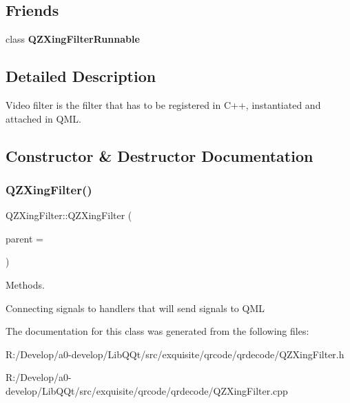 \subsection*{Friends}
\begin{DoxyCompactItemize}
\item 
\mbox{\label{class_q_z_xing_filter_a090ad605c3b75647b52060342ec02c23}} 
class {\bfseries Q\+Z\+Xing\+Filter\+Runnable}
\end{DoxyCompactItemize}


\subsection{Detailed Description}
Video filter is the filter that has to be registered in C++, instantiated and attached in Q\+ML. 

\subsection{Constructor \& Destructor Documentation}
\mbox{\label{class_q_z_xing_filter_a544277b8424ac9f41506ec7aa3e22395}} 
\subsubsection{\texorpdfstring{Q\+Z\+Xing\+Filter()}{QZXingFilter()}}
{\footnotesize\ttfamily Q\+Z\+Xing\+Filter\+::\+Q\+Z\+Xing\+Filter (\begin{DoxyParamCaption}\item[{Q\+Object $\ast$}]{parent = {} }\end{DoxyParamCaption})\hspace{0.3cm}{\ttfamily [explicit]}}



Methods. 

Connecting signals to handlers that will send signals to Q\+ML 

The documentation for this class was generated from the following files\+:\begin{DoxyCompactItemize}
\item 
R\+:/\+Develop/a0-\/develop/\+Lib\+Q\+Qt/src/exquisite/qrcode/qrdecode/Q\+Z\+Xing\+Filter.\+h\item 
R\+:/\+Develop/a0-\/develop/\+Lib\+Q\+Qt/src/exquisite/qrcode/qrdecode/Q\+Z\+Xing\+Filter.\+cpp\end{DoxyCompactItemize}
